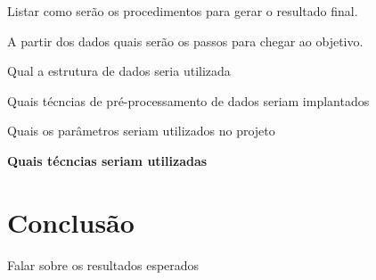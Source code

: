 \documentclass{sigchi}
\begin{document}
Listar como serão os procedimentos para gerar o resultado final.

A partir dos dados quais serão os passos para chegar ao objetivo.

Qual a estrutura de dados seria utilizada

Quais técncias de pré-processamento de dados seriam implantados

Quais os parâmetros seriam utilizados no projeto

\textbf{Quais técncias seriam utilizadas}


\section{Conclusão}

Falar sobre os resultados esperados


\balance{}



\end{document}
